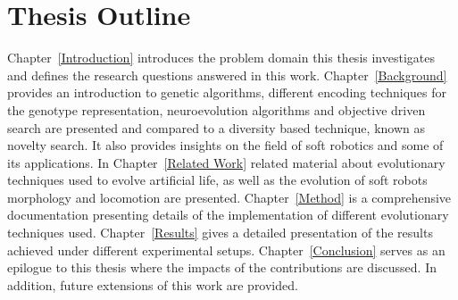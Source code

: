 \section{Thesis Outline}
Chapter~\ref{Introduction} introduces the problem domain this thesis investigates and defines the research questions answered in this work. Chapter~\ref{Background} provides an introduction to genetic algorithms, different encoding techniques for the genotype representation, neuroevolution algorithms and objective driven search are presented and compared to a diversity based technique, known as novelty search. It also provides insights on the field of soft robotics and some of its applications. In Chapter~\ref{Related Work} related material about evolutionary techniques used to evolve artificial life, as well as the evolution of soft robots morphology and locomotion are presented. Chapter~\ref{Method} is a comprehensive documentation presenting details of the implementation of different evolutionary techniques used. Chapter~\ref{Results} gives a detailed presentation of the results achieved under different experimental setups. Chapter~\ref{Conclusion} serves as an epilogue to this thesis where the impacts of the contributions are discussed. In addition, future extensions of this work are provided.






